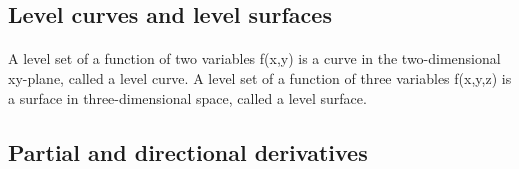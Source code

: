 \documentclass[12pt]{article}
\begin{document}
\subsection{Level curves and level surfaces}
\paragraph{}
A level set of a function of two variables f(x,y) is a curve in the two-dimensional xy-plane, called a level curve. A level set of a function of three variables f(x,y,z) is a surface in three-dimensional space, called a level surface.

\subsection{Partial and directional derivatives}
\paragraph{}
\end{document}
